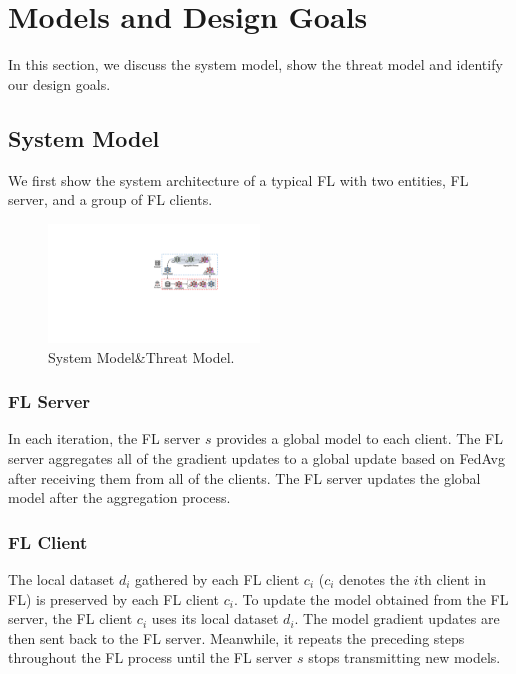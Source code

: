 \documentclass[lettersize,journal]{IEEEtran}
\begin{document}
\section{Models and Design Goals}

In this section, we discuss the system model, show the threat model and identify our design goals.

\subsection{System Model}We first show the system architecture of a typical FL with two entities, FL server, and a group of FL clients.
  \begin{figure}
    \centering
  \includegraphics[width=0.5\textwidth]{figures/Figure_System.pdf}
  \caption{System Model\&Threat Model.}
  \label{fig_system}
  \end{figure}   
\subsubsection{{FL Server}} In each iteration, the FL server $s$ provides a global model to each client. The FL server aggregates all of the gradient updates to a global update based on FedAvg after receiving them from all of the clients. The FL server updates the global model after the aggregation process.

\subsubsection{{FL Client}} The local dataset $d_i$ gathered by each FL client $c_i$ ($c_i$ denotes the $i$th client in FL) is preserved by each FL client $c_i$. To update the model obtained from the FL server, the FL client $c_i$ uses its local dataset $d_i$. The model gradient updates are then sent back to the FL server. Meanwhile, it repeats the preceding steps throughout the FL process until the FL server $s$ stops transmitting new models.
\end{document}
